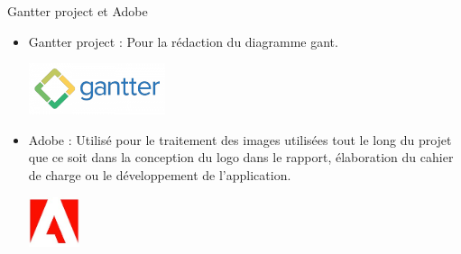 \documentclass{beamer}
\begin{document}
\begin{frame}{Gantter project et Adobe}
\begin{itemize}
\item Gantter project : Pour la rédaction du diagramme gant.
\begin{center}
    \includegraphics[width=4cm]{pic/gantter.png}
\end{center}\pause
\item Adobe : Utilisé pour le traitement des images utilisées tout le long du projet que ce soit dans la conception du logo dans le rapport, élaboration du cahier de charge ou le développement de l’application.
\begin{center}
    \includegraphics[width=1.5cm]{pic/Adobe.jpg}
\end{center}
\end{itemize}
\end{frame}
\end{document}
